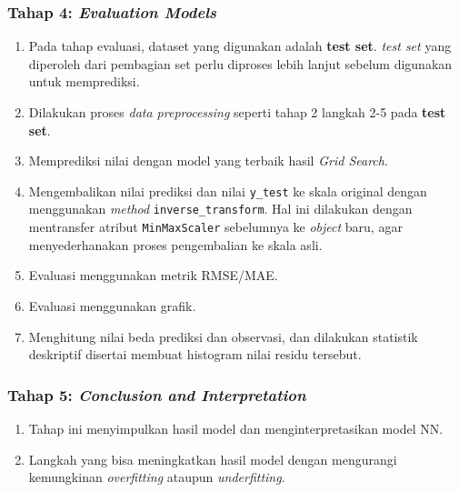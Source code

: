 \documentclass[11pt]{article}
\providecommand{\tightlist}{%
      \setlength{\itemsep}{0pt}\setlength{\parskip}{0pt}}
\begin{document}
\hypertarget{tahap-4-evaluation-models}{%
\subsubsection{\texorpdfstring{Tahap 4: \emph{Evaluation
Models}}{Tahap 4: Evaluation Models}}\label{tahap-4-evaluation-models}}

\begin{enumerate}
\def\labelenumi{\arabic{enumi}.}
\tightlist
\item
  Pada tahap evaluasi, dataset yang digunakan adalah \textbf{test set}.
  \emph{test set} yang diperoleh dari pembagian set perlu diproses lebih
  lanjut sebelum digunakan untuk memprediksi.
\item
  Dilakukan proses \emph{data preprocessing} seperti tahap 2 langkah 2-5
  pada \textbf{test set}.
\item
  Memprediksi nilai dengan model yang terbaik hasil \emph{Grid Search}.
\item
  Mengembalikan nilai prediksi dan nilai \texttt{y\_test} ke skala
  original dengan menggunakan \emph{method} \texttt{inverse\_transform}.
  Hal ini dilakukan dengan mentransfer atribut \texttt{MinMaxScaler}
  sebelumnya ke \emph{object} baru, agar menyederhanakan proses
  pengembalian ke skala asli.
\item
  Evaluasi menggunakan metrik RMSE/MAE.
\item
  Evaluasi menggunakan grafik.
\item
  Menghitung nilai beda prediksi dan observasi, dan dilakukan statistik
  deskriptif disertai membuat histogram nilai residu tersebut.
\end{enumerate}

\hypertarget{tahap-5-conclusion-and-interpretation}{%
\subsubsection{\texorpdfstring{Tahap 5: \emph{Conclusion and
Interpretation}}{Tahap 5: Conclusion and Interpretation}}\label{tahap-5-conclusion-and-interpretation}}

\begin{enumerate}
\def\labelenumi{\arabic{enumi}.}
\tightlist
\item
  Tahap ini menyimpulkan hasil model dan menginterpretasikan model NN.
\item
  Langkah yang bisa meningkatkan hasil model dengan mengurangi
  kemungkinan \emph{overfitting} ataupun \emph{underfitting}.
\end{enumerate}
\end{document}
